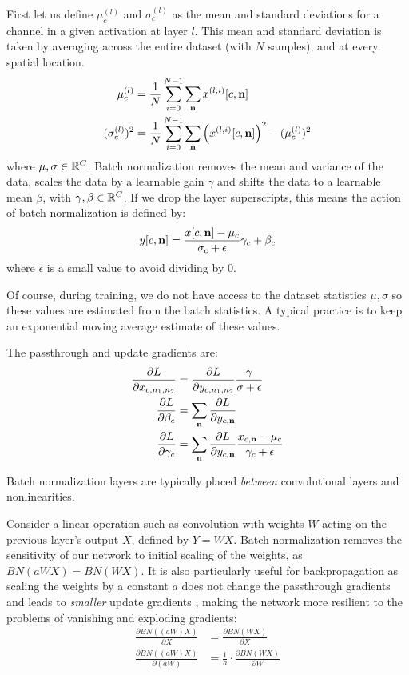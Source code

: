 First let us define $\mu_c^{(l)}$ and $\sigma_c^{(l)}$ as the mean and standard deviations
for a channel in a given activation at layer $l$. This mean and standard deviation is taken by
averaging across the entire dataset (with $N$ samples), and at every spatial location.
\begin{align}
  \mu_c^{(l)} &= \frac{1}{N}\sum_{i=0}^{N-1} \sum_\nn x^{(l, i)}[c, \nn] \\
  (\sigma_c^{(l)})^2 &=  \frac{1}{N} \sum_{i=0}^{N-1} \sum_\nn \left(x^{(l, i)}[c, \nn]\right)^2 - (\mu^{(l)}_c)^2
\end{align}
where $\mu, \sigma \in \reals[C]$.
Batch normalization removes the mean and variance of the data, scales the data
by a learnable gain $\gamma$ and shifts the data to a learnable mean $\beta$,
with $\gamma, \beta \in \reals[C]$. If we drop the layer superscripts, this
means the action of batch normalization is defined by:
\begin{equation}
  y[c, \nn] = \frac{x[c, \nn] - \mu_c}{\sigma_c + \epsilon}\gamma_c + \beta_c
\end{equation}
where $\epsilon$ is a small value to avoid dividing by 0.

Of course, during training, we do not have access to the dataset statistics $\mu, \sigma$
so these values are estimated from the batch statistics. A typical practice
is to keep an exponential moving average estimate of these values.

The passthrough and update gradients are:
\begin{align}
  \dydx{L}{x_{c, n_1, n_2}} &= \dydx{L}{y_{c, n_1, n_2}}\frac{\gamma}{\sigma + \epsilon}\\
  \dydx{L}{\beta_c} &=  \sum_\nn \dydx{L}{y_{c, \nn}}\\
  \dydx{L}{\gamma_c} &= \sum_\nn \dydx{L}{y_{c, \nn}}\frac{x_{c, \nn} - \mu_c}{\gamma_c + \epsilon}
\end{align}

Batch normalization layers are typically placed \emph{between} convolutional layers
and nonlinearities.

Consider a linear operation such as convolution with weights $W$ acting on the previous layer's
output $X$, defined by $Y = WX$.  Batch normalization removes the sensitivity of our network to
initial scaling of the weights, as $BN(aWX) = BN(WX)$.
It is also particularly useful for backpropagation as scaling the weights by a constant $a$ 
does not change the passthrough gradients and leads to \emph{smaller}
update gradients \cite{ioffe_batch_2015}, making the network more resilient to
the problems of vanishing and exploding gradients:
\begin{align}
  \frac{\partial BN((aW)X)}{\partial X} & =  \frac{\partial
  BN(WX)}{\partial X} \nonumber\\
  \frac{\partial BN((aW)X)}{\partial (aW)} & =  \frac{1}{a} \cdot \frac{\partial
  BN(WX)}{\partial W}
\end{align}

